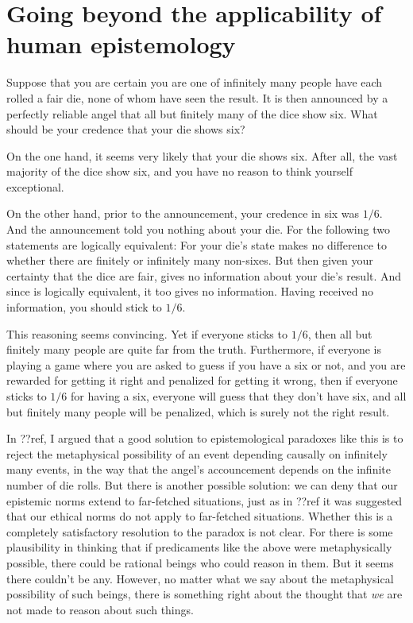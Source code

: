 \section{Going beyond the applicability of human epistemology}
Suppose that you are certain you are one of infinitely many people have each rolled a fair die, none of whom have seen the 
result. It is then announced by a perfectly reliable angel that all but finitely many of the dice show six. 
What should be your credence that your die shows six? 

On the one hand, it seems very likely that your die shows six. After all, the vast majority of the dice show
six, and you have no reason to think yourself exceptional. 

On the other hand, prior to the announcement, your credence in six was $1/6$. And the announcement told you nothing 
about your die. For the following two statements are logically equivalent:
For your die's state makes no difference to whether there are finitely or infinitely many non-sixes.
But then given your certainty that the dice are fair,  gives no information about 
your die's result. And since  is logically equivalent, it too gives no information.
Having received no information, you should stick to $1/6$. 

This reasoning seems convincing. Yet if everyone sticks to $1/6$, then all but finitely many people are quite far 
from the truth. Furthermore, if everyone is playing a game where you are asked to guess if you have a six or not,
and you are rewarded for getting it right and penalized for getting it wrong, then if everyone sticks to $1/6$
for having a six, everyone will guess that they don't have six, and all but finitely many people will be penalized,
which is surely not the right result.

In ??ref, I argued that a good solution to epistemological paradoxes like this is to reject the metaphysical possibility
of an event depending causally on infinitely many events, in the way that the angel's accouncement depends on the infinite
number of die rolls. But there is another possible solution: we can deny that our epistemic norms extend to far-fetched
situations, just as in ??ref it was suggested that our ethical norms do not apply to far-fetched situations. Whether this is 
a completely satisfactory resolution to the paradox is not clear. For there is some plausibility in thinking that if 
predicaments like the above were metaphysically possible, there could be rational beings who could reason
in them. But it seems there couldn't be any. However, no matter what we say about the metaphysical possibility of such beings,
there is something right about the thought that \textit{we} are not made to reason about such things.

